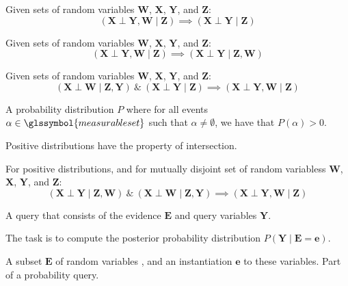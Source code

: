 {%
  Given sets of random variables $\bm{W}$, $\bm{X}$, $\bm{Y}$, and $\bm{Z}$:
  \begin{equation*}
    (\bm{X}\perp\bm{Y},\bm{W}\mid\bm{Z})\implies(\bm{X}\perp\bm{Y}\mid\bm{Z})
  \end{equation*}
}

{%
  Given sets of random variables $\bm{W}$, $\bm{X}$, $\bm{Y}$, and $\bm{Z}$:
  \begin{equation*}
    (\bm{X}\perp\bm{Y},\bm{W}\mid \bm{Z})\implies(\bm{X}\perp\bm{Y}\mid\bm{Z},\bm{W})
  \end{equation*}
}

{%
  Given sets of random variables $\bm{W}$, $\bm{X}$, $\bm{Y}$, and $\bm{Z}$:
  \begin{equation*}
    (\bm{X}\perp\bm{W}\mid\bm{Z},\bm{Y})~\&~(\bm{X}\perp\bm{Y}\mid\bm{Z})\implies(\bm{X}\perp\bm{Y},\bm{W}\mid\bm{Z})
  \end{equation*}
}

{%
  A \gls{probability distribution} $P$ where for all events $\alpha\in\glssymbol{measurable set}$ such that $\alpha\neq\emptyset$, we have that $P(\alpha)>0$.

  Positive distributions have the property of \gls{intersection}.
}

{%
  For \glspl{positive distribution}, and for mutually disjoint \glspl{set of random variables} $\bm{W}$, $\bm{X}$, $\bm{Y}$, and $\bm{Z}$:
  \begin{equation*}
    (\bm{X}\perp\bm{Y}\mid\bm{Z},\bm{W})~\&~(\bm{X}\perp\bm{W}\mid\bm{Z},\bm{Y})\implies(\bm{X}\perp\bm{Y},\bm{W}\mid\bm{Z})
  \end{equation*}
}

{%
  A query that consists of the \gls{evidence} $\bm{E}$ and \gls{query variables} $\bm{Y}$.

  The task is to compute the \gls{posterior probability distribution} $P(\bm{Y}\mid\bm{E}=\bm{e})$.
}

{%
  A subset $\bm{E}$ of \glspl{random variable} , and an instantiation $\bm{e}$ to these variables. Part of a \gls{probability query}.
}

